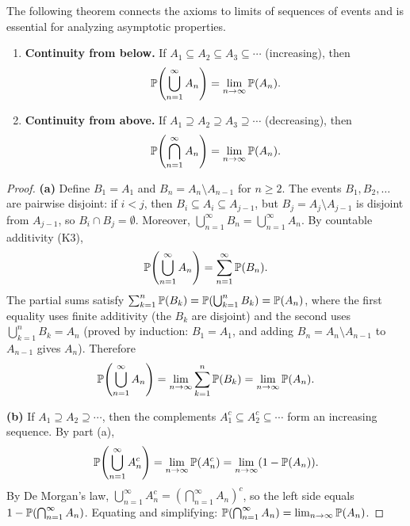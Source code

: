 \documentclass[11pt,a4paper]{article}
\begin{document}
The following theorem connects the axioms to limits of sequences of events
and is essential for analyzing asymptotic properties.

\begin{theorem}
\label{thm:continuity}
\begin{enumerate}[nosep,label=(\alph*)]
    \item \textbf{Continuity from below.} If
    $A_1 \subseteq A_2 \subseteq A_3 \subseteq \cdots$ (increasing), then
    \[
        \mathbb{P}\!\left(\bigcup_{n=1}^\infty A_n\right)
        = \lim_{n \to \infty} \mathbb{P}(A_n).
    \]
    \item \textbf{Continuity from above.} If
    $A_1 \supseteq A_2 \supseteq A_3 \supseteq \cdots$ (decreasing), then
    \[
        \mathbb{P}\!\left(\bigcap_{n=1}^\infty A_n\right)
        = \lim_{n \to \infty} \mathbb{P}(A_n).
    \]
\end{enumerate}
\end{theorem}

\begin{proof}
\textbf{(a)} Define $B_1 = A_1$ and $B_n = A_n \setminus A_{n-1}$ for
$n \geq 2$. The events $B_1, B_2, \ldots$ are pairwise disjoint: if
$i < j$, then $B_i \subseteq A_i \subseteq A_{j-1}$, but
$B_j = A_j \setminus A_{j-1}$ is disjoint from $A_{j-1}$, so
$B_i \cap B_j = \emptyset$. Moreover,
$\bigcup_{n=1}^\infty B_n = \bigcup_{n=1}^\infty A_n$. By countable
additivity (K3),
\[
    \mathbb{P}\!\left(\bigcup_{n=1}^\infty A_n\right)
    = \sum_{n=1}^\infty \mathbb{P}(B_n).
\]
The partial sums satisfy
$\sum_{k=1}^n \mathbb{P}(B_k)
= \mathbb{P}\!\left(\bigcup_{k=1}^n B_k\right)
= \mathbb{P}(A_n)$,
where the first equality uses finite additivity (the $B_k$ are disjoint)
and the second uses
$\bigcup_{k=1}^n B_k = A_n$ (proved by induction: $B_1 = A_1$, and
adding $B_n = A_n \setminus A_{n-1}$ to $A_{n-1}$ gives $A_n$).
Therefore
\[
    \mathbb{P}\!\left(\bigcup_{n=1}^\infty A_n\right)
    = \lim_{n \to \infty} \sum_{k=1}^n \mathbb{P}(B_k)
    = \lim_{n \to \infty} \mathbb{P}(A_n).
\]

\textbf{(b)} If $A_1 \supseteq A_2 \supseteq \cdots$, then the complements
$A_1^c \subseteq A_2^c \subseteq \cdots$ form an increasing sequence. By
part (a),
\[
    \mathbb{P}\!\left(\bigcup_{n=1}^\infty A_n^c\right)
    = \lim_{n \to \infty} \mathbb{P}(A_n^c)
    = \lim_{n \to \infty} (1 - \mathbb{P}(A_n)).
\]
By De Morgan's law,
$\bigcup_{n=1}^\infty A_n^c = \left(\bigcap_{n=1}^\infty A_n\right)^c$,
so the left side equals
$1 - \mathbb{P}\!\left(\bigcap_{n=1}^\infty A_n\right)$. Equating and
simplifying:
$\mathbb{P}\!\left(\bigcap_{n=1}^\infty A_n\right)
= \lim_{n \to \infty} \mathbb{P}(A_n)$.
\end{proof}
\end{document}
